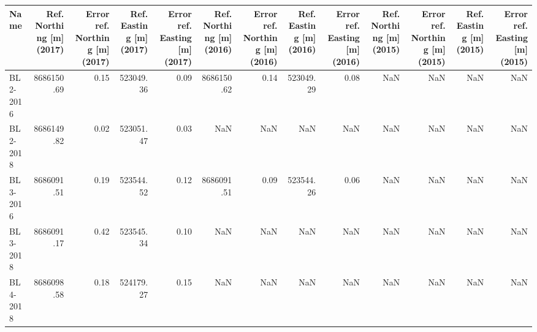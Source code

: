 \begin{tabular}{lrrrrrrrrrrrr}
\toprule
        Name &  Ref. Northing [m] (2017) &  Error ref. Northing [m] (2017) &  Ref. Easting [m] (2017) &  Error ref. Easting [m] (2017) &  Ref. Northing [m] (2016) &  Error ref. Northing [m] (2016) &  Ref. Easting [m] (2016) &  Error ref. Easting [m] (2016) &  Ref. Northing [m] (2015) &  Error ref. Northing [m] (2015) &  Ref. Easting [m] (2015) &  Error ref. Easting [m] (2015) \\
\midrule
    BL2-2016 &                8686150.69 &                            0.15 &                523049.36 &                           0.09 &                8686150.62 &                            0.14 &                523049.29 &                           0.08 &                       NaN &                             NaN &                      NaN &                            NaN \\
    BL2-2018 &                8686149.82 &                            0.02 &                523051.47 &                           0.03 &                       NaN &                             NaN &                      NaN &                            NaN &                       NaN &                             NaN &                      NaN &                            NaN \\
    BL3-2016 &                8686091.51 &                            0.19 &                523544.52 &                           0.12 &                8686091.51 &                            0.09 &                523544.26 &                           0.06 &                       NaN &                             NaN &                      NaN &                            NaN \\
    BL3-2018 &                8686091.17 &                            0.42 &                523545.34 &                           0.10 &                       NaN &                             NaN &                      NaN &                            NaN &                       NaN &                             NaN &                      NaN &                            NaN \\
    BL4-2018 &                8686098.58 &                            0.18 &                524179.27 &                           0.15 &                       NaN &                             NaN &                      NaN &                            NaN &                       NaN &                             NaN &                      NaN &                            NaN \\

\end{tabular}
